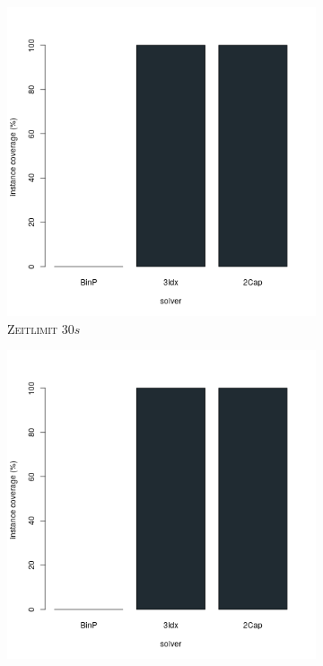 \begin{figure}[H]
\centering

\begin{subfigure}[b]{0.3\textwidth}
\centering
\includegraphics[width=1.1\textwidth]{img/solver_instance_coverage_b=2_m_30s.png}
\caption{\textsc{Zeitlimit} $30s$}
\label{fig:instance_cov_b=2_m_a}
\end{subfigure}
\hfill
\begin{subfigure}[b]{0.3\textwidth}
\centering
\includegraphics[width=1.1\textwidth]{img/solver_instance_coverage_b=2_m_60s.png}

\end{subfigure}
\end{figure}
